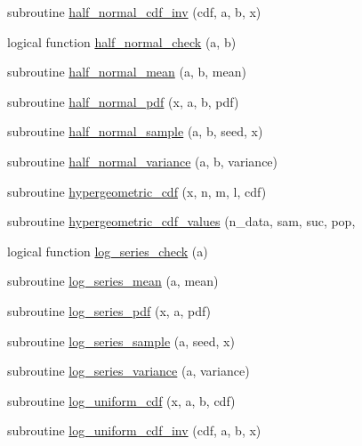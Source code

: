 \begin{DoxyCompactItemize}
\item 
subroutine \hyperlink{_bhabha__fortran__sem__doxy_8f_ab3ab8dee9a6bab9e5f838055b6a15e32}{half\+\_\+normal\+\_\+cdf\+\_\+inv} (cdf, a, b, x)
\item 
logical function \hyperlink{_bhabha__fortran__sem__doxy_8f_aff12e14edd4bf669955f0a594154edf8}{half\+\_\+normal\+\_\+check} (a, b)
\item 
subroutine \hyperlink{_bhabha__fortran__sem__doxy_8f_a113c46e78879c405f2eac9a5ffc6df15}{half\+\_\+normal\+\_\+mean} (a, b, mean)
\item 
subroutine \hyperlink{_bhabha__fortran__sem__doxy_8f_ac348bef959fa6ccdecc97def06ad18e3}{half\+\_\+normal\+\_\+pdf} (x, a, b, pdf)
\item 
subroutine \hyperlink{_bhabha__fortran__sem__doxy_8f_ac04ea3c647fa31eab3b163f78f98e75b}{half\+\_\+normal\+\_\+sample} (a, b, seed, x)
\item 
subroutine \hyperlink{_bhabha__fortran__sem__doxy_8f_a3736473676f16f37ee61f098b0d84ab0}{half\+\_\+normal\+\_\+variance} (a, b, variance)
\item 
subroutine \hyperlink{_bhabha__fortran__sem__doxy_8f_af1aca52a5977f25a6cb499968b784a17}{hypergeometric\+\_\+cdf} (x, n, m, l, cdf)
\item 
subroutine \hyperlink{_bhabha__fortran__sem__doxy_8f_a6ebfe3df3fb5de745d4262003a563ca2}{hypergeometric\+\_\+cdf\+\_\+values} (n\+\_\+data, sam, suc, pop,
\item 
logical function \hyperlink{_bhabha__fortran__sem__doxy_8f_a904e056ded5ca1c2d426f58301050514}{log\+\_\+series\+\_\+check} (a)
\item 
subroutine \hyperlink{_bhabha__fortran__sem__doxy_8f_a3f4273816a7b8ae63fa685d5eb79e2b8}{log\+\_\+series\+\_\+mean} (a, mean)
\item 
subroutine \hyperlink{_bhabha__fortran__sem__doxy_8f_a1953093828435ce6e81bbe4921d20c77}{log\+\_\+series\+\_\+pdf} (x, a, pdf)
\item 
subroutine \hyperlink{_bhabha__fortran__sem__doxy_8f_acf82272a3993849e408a1b4ef2143c73}{log\+\_\+series\+\_\+sample} (a, seed, x)
\item 
subroutine \hyperlink{_bhabha__fortran__sem__doxy_8f_ac3ab3c963d117a0ca318fa9e93c94269}{log\+\_\+series\+\_\+variance} (a, variance)
\item 
subroutine \hyperlink{_bhabha__fortran__sem__doxy_8f_adf657f01da631a8c9b66c18577cf36d0}{log\+\_\+uniform\+\_\+cdf} (x, a, b, cdf)
\item 
subroutine \hyperlink{_bhabha__fortran__sem__doxy_8f_af932827c125bbf033c8f22fb759fb08d}{log\+\_\+uniform\+\_\+cdf\+\_\+inv} (cdf, a, b, x)

\end{DoxyCompactItemize}
